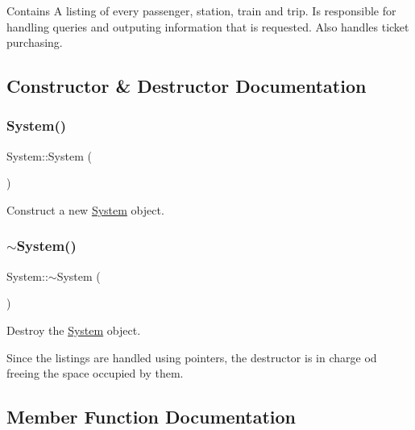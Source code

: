 Contains A listing of every passenger, station, train and trip. Is responsible for handling queries and outputing information that is requested. Also handles ticket purchasing. 

\subsection{Constructor \& Destructor Documentation}
\mbox{\label{classSystem_a7ffb94a5a2db03014de0a8440f0cee3a}} 
\subsubsection{\texorpdfstring{System()}{System()}}
{\footnotesize\ttfamily System\+::\+System (\begin{DoxyParamCaption}{ }\end{DoxyParamCaption})\hspace{0.3cm}{\ttfamily [default]}}



Construct a new \mbox{\hyperlink{classSystem}{System}} object. 

\mbox{\label{classSystem_a3be70bb338e3f062f821173fd15680d0}} 
\subsubsection{\texorpdfstring{$\sim$\+System()}{~System()}}
{\footnotesize\ttfamily System\+::$\sim$\+System (\begin{DoxyParamCaption}{ }\end{DoxyParamCaption})}



Destroy the \mbox{\hyperlink{classSystem}{System}} object. 

Since the listings are handled using pointers, the destructor is in charge od freeing the space occupied by them. 

\subsection{Member Function Documentation}
\mbox{\label{classSystem_a7e2c83b2b5749886087f9d5d86ad241b}} 
